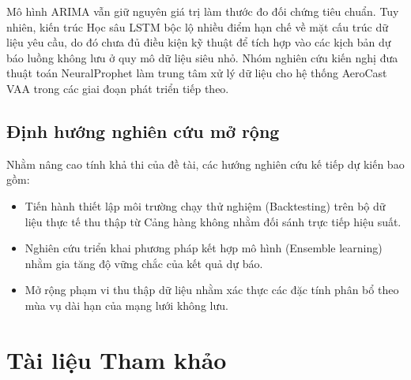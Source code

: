 \documentclass[12pt,a4paper]{article}
\begin{document}
Mô hình ARIMA vẫn giữ nguyên giá trị làm thước đo đối chứng tiêu chuẩn. Tuy nhiên, kiến trúc Học sâu LSTM bộc lộ nhiều điểm hạn chế về mặt cấu trúc dữ liệu yêu cầu, do đó chưa đủ điều kiện kỹ thuật để tích hợp vào các kịch bản dự báo luồng không lưu ở quy mô dữ liệu siêu nhỏ. Nhóm nghiên cứu kiến nghị đưa thuật toán NeuralProphet làm trung tâm xử lý dữ liệu cho hệ thống AeroCast VAA trong các giai đoạn phát triển tiếp theo.

\subsection{Định hướng nghiên cứu mở rộng}

Nhằm nâng cao tính khả thi của đề tài, các hướng nghiên cứu kế tiếp dự kiến bao gồm:
\begin{itemize}
    \item Tiến hành thiết lập môi trường chạy thử nghiệm (Backtesting) trên bộ dữ liệu thực tế thu thập từ Cảng hàng không nhằm đối sánh trực tiếp hiệu suất.
    \item Nghiên cứu triển khai phương pháp kết hợp mô hình (Ensemble learning) nhằm gia tăng độ vững chắc của kết quả dự báo.
    \item Mở rộng phạm vi thu thập dữ liệu nhằm xác thực các đặc tính phân bổ theo mùa vụ dài hạn của mạng lưới không lưu.
\end{itemize}


\section{Tài liệu Tham khảo}
\end{document}
